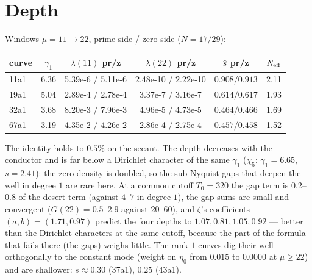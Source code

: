 \documentclass[11pt]{article}
\begin{document}
\section{Depth}
Windows $\mu=11\to22$, prime side / zero side ($N=17/29$):
\begin{center}\small
\begin{tabular}{lccccc}\toprule
curve & $\gamma_1$ & $\lambda(11)$ pr/z & $\lambda(22)$ pr/z & $\hat s$ pr/z & $N_{\rm eff}$\\\midrule
11a1 & 6.36 & 5.39e-6 / 5.11e-6 & 2.48e-10 / 2.22e-10 & $\mathbf{0.908/0.913}$ & 2.11\\
19a1 & 5.04 & 2.89e-4 / 2.78e-4 & 3.37e-7 / 3.16e-7 & $0.614/0.617$ & 1.93\\
32a1 & 3.68 & 8.20e-3 / 7.96e-3 & 4.96e-5 / 4.73e-5 & $0.464/0.466$ & 1.69\\
67a1 & 3.19 & 4.35e-2 / 4.26e-2 & 2.86e-4 / 2.75e-4 & $0.457/0.458$ & 1.52\\\bottomrule
\end{tabular}
\end{center}
The identity holds to $0.5\%$ on the secant. The depth decreases with the conductor and is far below a Dirichlet character of the same $\gamma_1$ ($\chi_5$: $\gamma_1=6.65$, $s=2.41$): the zero density is doubled, so the sub-Nyquist gaps that deepen the well in degree $1$ are rare here. At a common cutoff $T_0=320$ the gap term is $0.2$--$0.8$ of the desert term (against $4$--$7$ in degree $1$), the gap sums are small and convergent ($G(22)=0.5$--$2.9$ against $20$--$60$), and $\zeta$'s coefficients $(a,b)=(1.71,0.97)$ predict the four depths to $1.07,0.81,1.05,0.92$ --- better than the Dirichlet characters at the same cutoff, because the part of the formula that fails there (the gaps) weighs little. The rank-$1$ curves dig their well orthogonally to the constant mode (weight on $\eta_0$ from $0.015$ to $0.0000$ at $\mu\ge22$) and are shallower: $s\approx0.30$ (37a1), $0.25$ (43a1).
\end{document}
